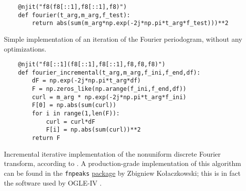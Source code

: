 \begin{listing}
	\begin{verbatim}
	@njit("f8(f8[::1],f8[::1],f8)")
	def fourier(t_arg,m_arg,f_test):
	    return abs(sum(m_arg*np.exp(-2j*np.pi*t_arg*f_test)))**2
	\end{verbatim}
	\caption[Naive implementation of the Fourier periodogram]{
		Simple implementation of an iteration of the Fourier periodogram, without any optimizations.
	}
	\label{lst:fourier-single}
\end{listing}

\begin{listing}
	\begin{verbatim}
	@njit("f8[::1](f8[::1],f8[::1],f8,f8,f8)")
	def fourier_incremental(t_arg,m_arg,f_ini,f_end,df):
	    dF = np.exp(-2j*np.pi*t_arg*df)
	    F = np.zeros_like(np.arange(f_ini,f_end,df))
	    curl = m_arg * np.exp(-2j*np.pi*t_arg*f_ini)
	    F[0] = np.abs(sum(curl))
	    for i in range(1,len(F)):
	        curl = curl*dF
	        F[i] = np.abs(sum(curl))**2
	    return F
	\end{verbatim}
	\caption[Incremental iterative implementation of the Fourier Periodogram]{
		Incremental iterative implementation of the nonuniform discrete Fourier transform, according to \cite{Kurtz1985}.
		A production-grade implementation of this algorithm can be found in the \texttt{fnpeaks} 
		\href{http://helas.astro.uni.wroc.pl/deliverables.php?lang=en&active=fnpeaks}{package} by Zbigniew Kołaczkowski;
		this is in fact the software used by OGLE-IV \citep{OGLE2016}.
	}
	\label{lst:fourier}
\end{listing}






